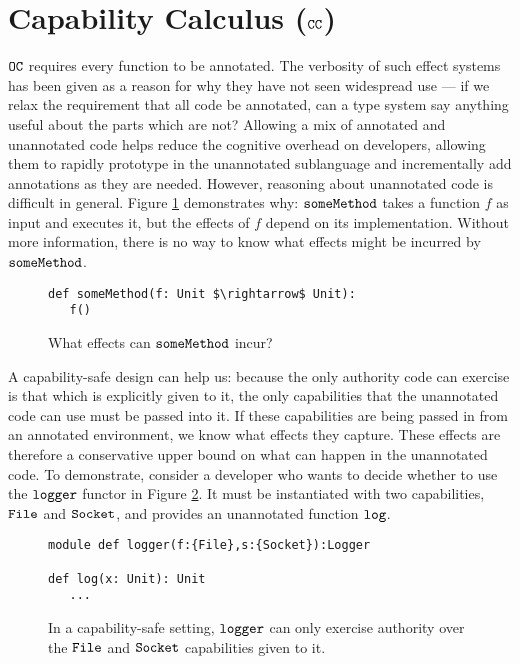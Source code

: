 \section{Capability Calculus ($\mathtt{CC}$)}

$\mathtt{OC}$ requires every function to be annotated. The verbosity of such effect systems has been given as a reason for why they have not seen widespread use \cite{rytz12} --- if we relax the requirement that all code be annotated, can a type system say anything useful about the parts which are not? Allowing a mix of annotated and unannotated code helps reduce the cognitive overhead on developers, allowing them to rapidly prototype in the unannotated sublanguage and incrementally add annotations as they are needed. However, reasoning about unannotated code is difficult in general. Figure \ref{fig:unannotated_reasoning} demonstrates why: $\mathtt{someMethod}$ takes a function $f$ as input and executes it, but the effects of $f$ depend on its implementation. Without more information, there is no way to know what effects might be incurred by $\mathtt{someMethod}$.


\begin{figure}[h]
\begin{lstlisting}
def someMethod(f: Unit $\rightarrow$ Unit):
   f()
\end{lstlisting}
\vspace{-7pt}
\caption{What effects can $\mathtt{someMethod}$ incur?}
\label{fig:unannotated_reasoning}
\end{figure}

A capability-safe design can help us: because the only authority code can exercise is that which is explicitly given to it, the only capabilities that the unannotated code can use must be passed into it. If these capabilities are being passed in from an annotated environment, we know what effects they capture. These effects are therefore a conservative upper bound on what can happen in the unannotated code. To demonstrate, consider a developer who wants to decide whether to use the $\mathtt{logger}$ functor in Figure \ref{fig:cc_motivation}. It must be instantiated with two capabilities, $\mathtt{File}$ and $\mathtt{Socket}$, and provides an unannotated function $\mathtt{log}$.

\begin{figure}[h]
\begin{lstlisting}
module def logger(f:{File},s:{Socket}):Logger

def log(x: Unit): Unit
   ...
\end{lstlisting}
\vspace{-7pt}
\caption{In a capability-safe setting, $\mathtt{logger}$ can only exercise authority over the $\mathtt{File}$ and $\mathtt{Socket}$ capabilities given to it.}
\label{fig:cc_motivation}
\end{figure}


